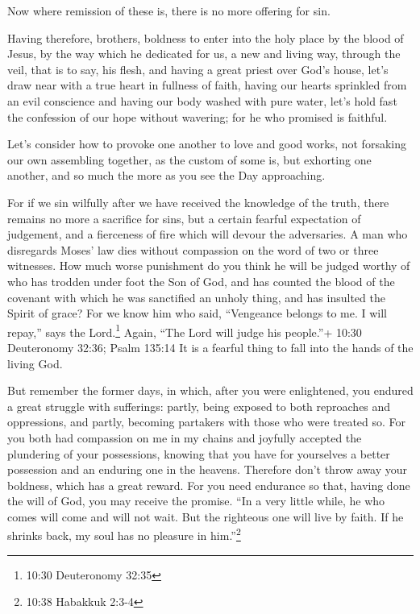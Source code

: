  Now where remission of these is, there is no more offering
for sin.

 Having therefore, brothers, boldness to enter into the
holy place by the blood of Jesus,  by the way which he
dedicated for us, a new and living way, through the veil, that is to
say, his flesh,  and having a great priest over God's
house,  let's draw near with a true heart in fullness of
faith, having our hearts sprinkled from an evil conscience and having
our body washed with pure water,  let's hold fast the
confession of our hope without wavering; for he who promised is
faithful.

 Let's consider how to provoke one another to love and good
works,  not forsaking our own assembling together, as the
custom of some is, but exhorting one another, and so much the more as
you see the Day approaching.

 For if we sin wilfully after we have received the
knowledge of the truth, there remains no more a sacrifice for sins,
 but a certain fearful expectation of judgement, and a
fierceness of fire which will devour the adversaries.  A
man who disregards Moses' law dies without compassion on the word of two
or three witnesses.  How much worse punishment do you think
he will be judged worthy of who has trodden under foot the Son of God,
and has counted the blood of the covenant with which he was sanctified
an unholy thing, and has insulted the Spirit of grace?  For
we know him who said, ``Vengeance belongs to me. I will repay,'' says
the Lord.\footnote{10:30 Deuteronomy 32:35} Again, ``The Lord will judge
his people.''+ 10:30 Deuteronomy 32:36; Psalm 135:14  It is
a fearful thing to fall into the hands of the living God.

 But remember the former days, in which, after you were
enlightened, you endured a great struggle with sufferings: 
partly, being exposed to both reproaches and oppressions, and partly,
becoming partakers with those who were treated so.  For you
both had compassion on me in my chains and joyfully accepted the
plundering of your possessions, knowing that you have for yourselves a
better possession and an enduring one in the heavens. 
Therefore don't throw away your boldness, which has a great reward.
 For you need endurance so that, having done the will of
God, you may receive the promise.  ``In a very little
while, he who comes will come and will not wait.  But the
righteous one will live by faith. If he shrinks back, my soul has no
pleasure in him.''\footnote{10:38 Habakkuk 2:3-4}

